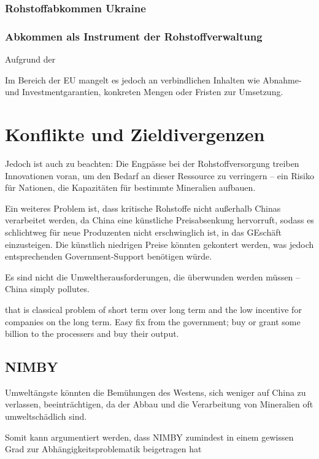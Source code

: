 \documentclass[12pt,a4paper,oneside]{book} %
\begin{document}
\subsubsection{Rohstoffabkommen Ukraine}


\subsubsection{Abkommen als Instrument der Rohstoffverwaltung}


Aufgrund der 

Im Bereich der EU mangelt es jedoch an verbindlichen Inhalten wie Abnahme- und Investmentgarantien, konkreten Mengen oder Fristen zur Umsetzung.

\section{Konflikte und Zieldivergenzen}

Jedoch ist auch zu beachten: Die Engpässe bei der Rohstoffversorgung treiben Innovationen voran, um den Bedarf an dieser Ressource zu verringern – ein Risiko für Nationen, die Kapazitäten für bestimmte Mineralien aufbauen.

Ein weiteres Problem ist, dass kritische Rohstoffe nicht außerhalb Chinas verarbeitet werden, da China eine künstliche Preisabsenkung hervorruft, sodass es schlichtweg für neue Produzenten nicht erschwinglich ist, in das GEschäft einzusteigen. Die künstlich niedrigen Preise könnten gekontert werden, was jedoch entsprechenden Government-Support benötigen würde.

Es sind nicht die Umweltherausforderungen, die überwunden werden müssen -- China simply pollutes.



that is classical problem of short term over long term and the low incentive for companies on the long term. Easy fix from the government; buy or grant some billion to the processers and buy their output.


\subsection{NIMBY}

Umweltängste könnten die Bemühungen des Westens, sich weniger auf China zu verlassen, beeinträchtigen, da der Abbau und die Verarbeitung von Mineralien oft umweltschädlich sind.

Somit kann argumentiert werden, dass NIMBY zumindest in einem gewissen Grad zur Abhängigkeitsproblematik beigetragen hat
\end{document}
